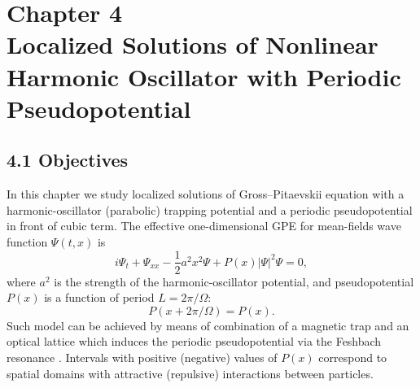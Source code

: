 \chapter*{{\normalfont Chapter 4} \\ Localized Solutions of Nonlinear Harmonic Oscillator with Periodic Pseudopotential}
\label{chapter:IV}

\section*{4.1 Objectives}

In this chapter we study localized solutions of Gross--Pitaevskii equation with a harmonic-oscillator (parabolic) trapping potential and a periodic pseudopotential in front of cubic term.
The effective one-dimensional GPE for mean-fields wave function $\Psi(t, x)$ is
\begin{equation}
	i \Psi_t + \Psi_{xx} - \dfrac{1}{2} a^2 x^2 \Psi + P(x) |\Psi|^2 \Psi = 0,
\label{eq:gpe-parabolic-non-scaled}
\end{equation}
where $a^2$ is the strength of the harmonic-oscillator potential, and pseudopotential $P(x)$ is a function of period $L = 2 \pi / \Omega$:
\begin{equation}
	P(x + 2 \pi / \Omega) = P(x).
\end{equation}
Such model can be achieved by means of combination of a magnetic trap and an optical lattice which induces the periodic pseudopotential via the Feshbach resonance \cite{SakaguchiMalomed2010}.
Intervals with positive (negative) values of $P(x)$ correspond to spatial domains with attractive (repulsive) interactions between particles.

